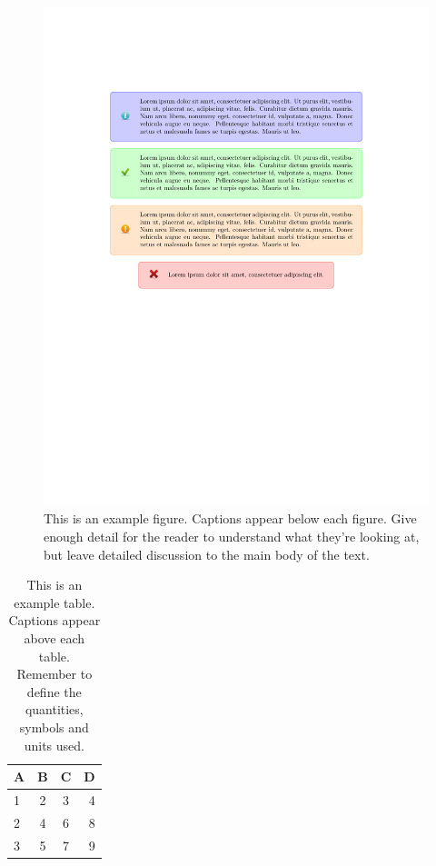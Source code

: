 \documentclass[fleqn,usenatbib]{mnras}
\begin{document}
\begin{figure}
	\includegraphics[width=\columnwidth]{example}
    \caption{This is an example figure. Captions appear below each figure.
	Give enough detail for the reader to understand what they're looking at,
	but leave detailed discussion to the main body of the text.}
    \label{fig:example_figure}
\end{figure}

\begin{table}
	\centering
	\caption{This is an example table. Captions appear above each table.
	Remember to define the quantities, symbols and units used.}
	\label{tab:example_table}
	\begin{tabular}{lccr} %
		\hline
		A & B & C & D\\
		\hline
		1 & 2 & 3 & 4\\
		2 & 4 & 6 & 8\\
		3 & 5 & 7 & 9\\
		\hline
	\end{tabular}
\end{table}
\end{document}
